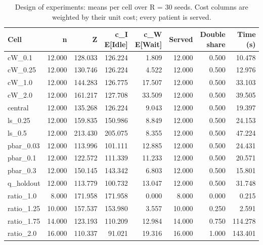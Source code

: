 \begin{table}[htbp]
\caption{Design of experiments: means per cell over R = 30 seeds. Cost columns are weighted by their unit cost; every patient is served.}
\label{tab:doe}
\begin{tabular}{lrrrrrrr}
\toprule
Cell & n & Z & c\_I E[Idle] & c\_W E[Wait] & Served & Double share & Time (s) \\
\midrule
cW\_0.1 & 12.000 & 128.033 & 126.224 & 1.809 & 12.000 & 0.500 & 10.478 \\
cW\_0.25 & 12.000 & 130.746 & 126.224 & 4.522 & 12.000 & 0.500 & 12.976 \\
cW\_1.0 & 12.000 & 144.283 & 126.775 & 17.507 & 12.000 & 0.500 & 33.103 \\
cW\_2.0 & 12.000 & 161.217 & 127.708 & 33.509 & 12.000 & 0.500 & 39.505 \\
central & 12.000 & 135.268 & 126.224 & 9.043 & 12.000 & 0.500 & 19.397 \\
ls\_0.25 & 12.000 & 159.835 & 150.986 & 8.849 & 12.000 & 0.500 & 24.153 \\
ls\_0.5 & 12.000 & 213.430 & 205.075 & 8.355 & 12.000 & 0.500 & 47.224 \\
pbar\_0.03 & 12.000 & 113.996 & 101.111 & 12.885 & 12.000 & 0.500 & 24.431 \\
pbar\_0.1 & 12.000 & 122.572 & 111.339 & 11.233 & 12.000 & 0.500 & 20.571 \\
pbar\_0.3 & 12.000 & 150.145 & 143.342 & 6.803 & 12.000 & 0.500 & 15.801 \\
q\_holdout & 12.000 & 113.779 & 100.732 & 13.047 & 12.000 & 0.500 & 31.748 \\
ratio\_1.0 & 8.000 & 171.958 & 171.958 & 0.000 & 8.000 & 0.000 & 0.215 \\
ratio\_1.25 & 10.000 & 157.537 & 153.980 & 3.557 & 10.000 & 0.250 & 2.591 \\
ratio\_1.75 & 14.000 & 123.193 & 110.209 & 12.984 & 14.000 & 0.750 & 114.278 \\
ratio\_2.0 & 16.000 & 110.337 & 91.021 & 19.316 & 16.000 & 1.000 & 143.401 \\
\bottomrule
\end{tabular}
\end{table}
